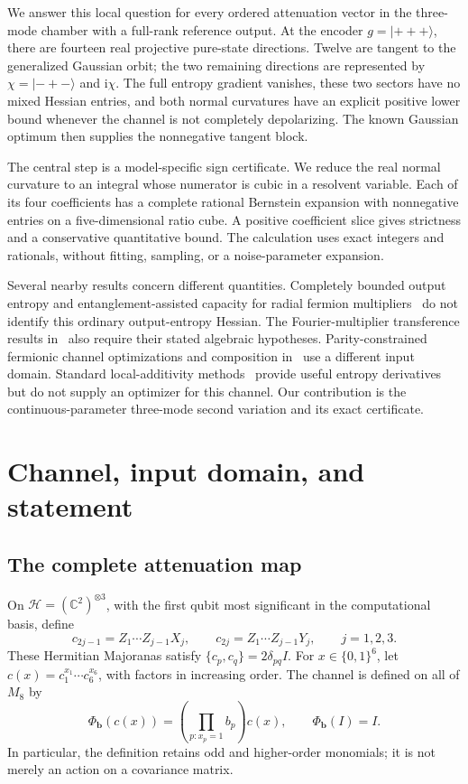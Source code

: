 \documentclass[11pt,a4paper]{article}
\newcommand{\ket}[1]{\lvert #1\rangle}
\newcommand{\ii}{\mathrm{i}}
\newcommand{\PhiB}{\Phi_{\boldsymbol b}}
\begin{document}
We answer this local question for every ordered attenuation vector in the
three-mode chamber with a full-rank reference output. At the encoder
$g=\ket{+++}$, there are fourteen real projective pure-state directions.
Twelve are tangent to the generalized Gaussian orbit; the two remaining
directions are represented by $\chi=\ket{-+-}$ and $\ii\chi$.
The full entropy gradient vanishes, these two sectors have no mixed
Hessian entries, and both normal curvatures have an explicit positive
lower bound whenever the channel is not completely depolarizing.
The known Gaussian optimum then supplies the nonnegative tangent block.

The central step is a model-specific sign certificate. We reduce the
real normal curvature to an integral whose numerator is cubic in a
resolvent variable. Each of its four coefficients has a complete rational
Bernstein expansion with nonnegative entries on a five-dimensional ratio
cube. A positive coefficient slice gives strictness and a conservative
quantitative bound. The calculation uses exact integers and rationals,
without fitting, sampling, or a noise-parameter expansion.

Several nearby results concern different quantities. Completely bounded
output entropy and entanglement-assisted capacity for radial fermion
multipliers~\cite{Arhancet2024} do not identify this ordinary output-entropy
Hessian. The Fourier-multiplier transference results
in~\cite{Arhancet2020} also require their stated algebraic hypotheses.
Parity-constrained fermionic channel optimizations and composition
in~\cite{Salek2026} use a different input domain. Standard local-additivity
methods~\cite{RuskaiYard2023} provide useful entropy derivatives but
do not supply an optimizer for this channel. Our contribution is the
continuous-parameter three-mode second variation and its exact certificate.

\section{Channel, input domain, and statement}
\subsection{The complete attenuation map}
On $\mathcal H=(\mathbb C^2)^{\otimes3}$, with the first qubit most
significant in the computational basis, define
\begin{equation}
 c_{2j-1}=Z_1\cdots Z_{j-1}X_j,\qquad
 c_{2j}=Z_1\cdots Z_{j-1}Y_j,\qquad j=1,2,3.
 \label{eq:JW}
\end{equation}
These Hermitian Majoranas satisfy
$\{c_p,c_q\}=2\delta_{pq}I$. For $x\in\{0,1\}^6$, let
$c(x)=c_1^{x_1}\cdots c_6^{x_6}$, with factors in increasing order.
The channel is defined on all of $M_8$ by
\begin{equation}
 \PhiB(c(x))=\left(\prod_{p:x_p=1}b_p\right)c(x),
 \qquad \PhiB(I)=I .\label{eq:channel}
\end{equation}
In particular, the definition retains odd and higher-order monomials;
it is not merely an action on a covariance matrix.
\end{document}
